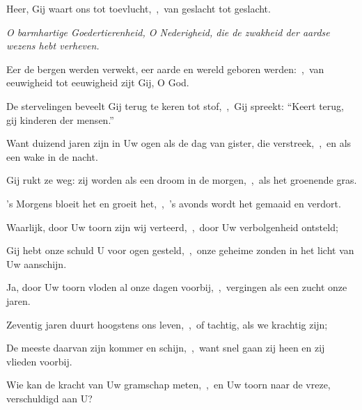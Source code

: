 \documentclass[12pt,twoside,a5paper]{article}
\begin{document}



\begin{halfparskip}
  Heer, Gij waart ons tot toevlucht,~\sep\ van geslacht tot geslacht.


   \emph{O barmhartige Goedertierenheid, O Nederigheid, die de zwakheid der aardse wezens hebt verheven.}

  Eer de bergen werden verwekt, eer aarde en wereld geboren werden:~\sep\ van eeuwigheid tot eeuwigheid zijt Gij, O God.

  De stervelingen beveelt Gij terug te keren tot stof,~\sep\ Gij spreekt: ``Keert terug, gij kinderen der mensen.''

  Want duizend jaren zijn in Uw ogen als de dag van gister, die verstreek,~\sep\ en als een wake in de nacht.

  Gij rukt ze weg: zij worden als een droom in de morgen,~\sep\ als het groenende gras.

  's Morgens bloeit het en groeit het,~\sep\ 's avonds wordt het gemaaid en verdort.
\end{halfparskip}


\begin{halfparskip}
  Waarlijk, door Uw toorn zijn wij verteerd,~\sep\ door Uw verbolgenheid ontsteld;

  Gij hebt onze schuld U voor ogen gesteld,~\sep\ onze geheime zonden in het licht van Uw aanschijn.

  Ja, door Uw toorn vloden al onze dagen voorbij,~\sep\ vergingen als een zucht onze jaren.

  Zeventig jaren duurt hoogstens ons leven,~\sep\ of tachtig, als we krachtig zijn;

  De meeste daarvan zijn kommer en schijn,~\sep\ want snel gaan zij heen en zij vlieden voorbij.

  Wie kan de kracht van Uw gramschap meten,~\sep\ en Uw toorn naar de vreze, verschuldigd aan U?
\end{halfparskip}

\end{document}
